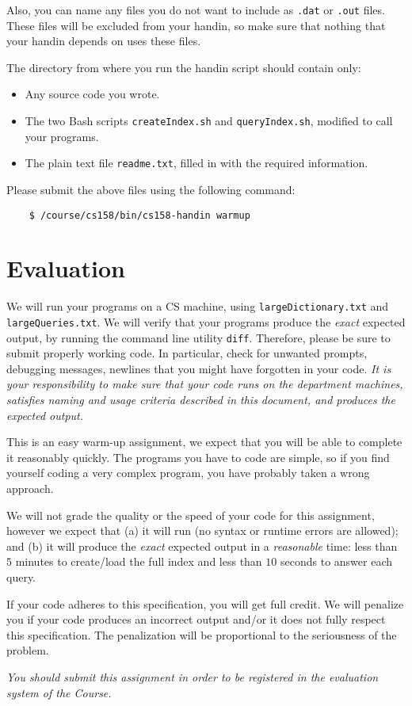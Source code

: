 \documentclass[10pt]{article}
\newcommand{\file}[1]{\texttt{#1}}
\begin{document}
Also, you can name any files you do not want to include
as \file{.dat} or \file{.out} files. These files will be excluded
from your handin, so make sure that nothing that your handin
depends on uses these files.

The directory from where you run the handin script should contain only:
\begin{itemize}
	\item Any source code you wrote.
	\item The two Bash scripts \file{createIndex.sh} and \file{queryIndex.sh},
		modified to call your programs.
	\item The plain text file \file{readme.txt}, filled in
        with the required information.
\end{itemize}

Please submit the above files using the following command:
\begin{verbatim}
    $ /course/cs158/bin/cs158-handin warmup
\end{verbatim}


\section{Evaluation}
\label{evaluation}

We will run your programs 
on a CS machine, using
\file{largeDictionary.txt} and
\file{largeQueries.txt}.
We will verify that your programs produce
the \emph{exact} expected output,
by running the command line
utility \file{diff}.
Therefore, please be sure to submit
properly working code.
In particular, check for unwanted prompts,
debugging messages, newlines
that you might have forgotten in your code.
\emph{It is your responsibility to make sure that
your code runs on the department machines,
satisfies naming and usage criteria described in this document,
and produces the expected output.}

This is an easy warm-up assignment,
we expect that you will be able to complete it
reasonably quickly.
The programs you have to code are simple,
so if you find yourself coding a very complex program,
you have probably taken a wrong approach.

We will not grade the quality
or the speed of your code for this assignment,
however we expect that
(a)  it will run (no syntax or runtime errors are allowed);
and (b) it will produce
the \emph{exact} expected output in a \emph{reasonable} time:
less than $5$ minutes to create/load the full index
and less than $10$ seconds to answer each query.

If your code adheres to this specification,
you will get full credit.
We will penalize you if your code
produces an incorrect output
and/or it does not fully respect this specification.
The penalization will be proportional
to the seriousness of the problem.

\emph{You should submit this assignment
in order to be registered
in the evaluation system of the Course.}

\vspace{1cm}
\end{document}
